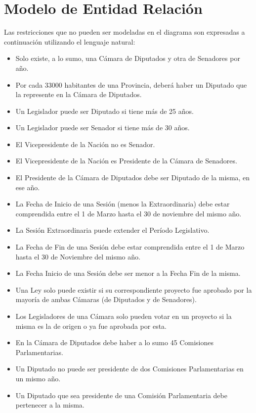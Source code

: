 \section{Modelo de Entidad Relación}


Las restricciones que no pueden ser modeladas en el diagrama son expresadas a continuación utilizando el lenguaje natural:
\begin{itemize}
	\item Solo existe, a lo sumo, una Cámara de Diputados y otra de Senadores por año. 
	\item Por cada 33000 habitantes de una Provincia, deberá haber un Diputado que la represente en la Cámara de Diputados. 
	\item Un Legislador puede ser Diputado si tiene más de 25 años.
	\item Un Legislador puede ser Senador si tiene más de 30 años.
	\item El Vicepresidente de la Nación no es Senador.
	\item El Vicepresidente de la Nación es Presidente de la Cámara de Senadores. 
	\item El Presidente de la Cámara de Diputados debe ser Diputado de la misma, en ese año. 
	\item La Fecha de Inicio de una Sesión (menos la Extraordinaria) debe estar comprendida entre el 1 de Marzo hasta el 30 de noviembre del mismo año.	
	\item La Sesión Extraordinaria puede extender el Período Legislativo. 
	\item La Fecha de Fin de una Sesión debe estar comprendida entre el 1 de Marzo hasta el 30 de Noviembre del mismo año.
	\item La Fecha Inicio de una Sesión debe ser menor a la Fecha Fin de la misma. 
	\item Una Ley solo puede existir si su correspondiente proyecto fue aprobado por la mayoría de ambas Cámaras (de Diputados y de Senadores).
	\item Los Legisladores de una Cámara solo pueden votar en un proyecto si la misma es la de origen o ya fue aprobada por esta.
	\item En la Cámara de Diputados debe haber a lo sumo 45 Comisiones Parlamentarias.
	\item Un Diputado no puede ser presidente de dos Comisiones Parlamentarias en un mismo año.
	\item Un Diputado que sea presidente de una Comisión Parlamentaria debe pertenecer a la misma. 

\end{itemize}
